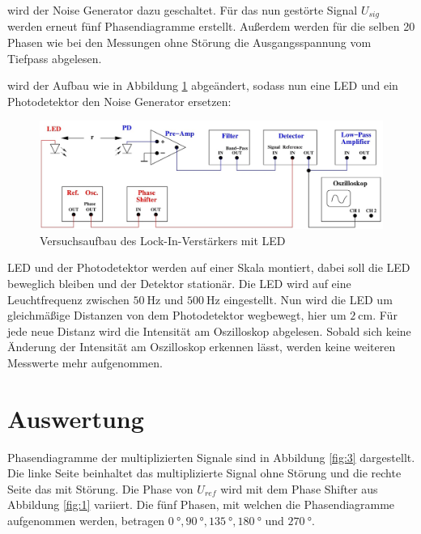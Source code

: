\justifying wird der Noise Generator dazu geschaltet. Für das nun gestörte Signal $U_{sig}$ werden erneut fünf Phasendiagramme
erstellt. Außerdem werden für die selben 20 Phasen wie bei den Messungen ohne Störung die Ausgangsspannung vom Tiefpass abgelesen. 

\justifying wird der Aufbau wie in Abbildung \ref{fig:2} abgeändert, sodass nun eine LED und ein Photodetektor den 
Noise Generator ersetzen:

\begin{figure}[H]
    \centering
    \includegraphics[width=\linewidth]{./images/lock-in_led.jpg}
    \caption{Versuchsaufbau des Lock-In-Verstärkers mit LED \cite{V303}}
    \label{fig:2}
\end{figure}

\justifying LED  und der Photodetektor werden auf einer Skala montiert, dabei soll die LED beweglich bleiben und der Detektor stationär.
Die LED wird auf eine Leuchtfrequenz zwischen $\SI{50}{\hertz}$ und $\SI{500}{\hertz}$ eingestellt. Nun wird die LED um gleichmäßige Distanzen
von dem Photodetektor wegbewegt, hier um $\SI{2}{\centi\meter}$. Für jede neue Distanz wird die Intensität am Oszilloskop abgelesen. Sobald sich keine
Änderung der Intensität am Oszilloskop erkennen lässt, werden keine weiteren Messwerte mehr aufgenommen.  


\section{Auswertung} \label{sec:5}

\justifying Phasendiagramme der multiplizierten Signale sind in Abbildung \ref{fig:3} dargestellt. Die linke Seite beinhaltet
das multiplizierte Signal ohne Störung und die rechte Seite das mit Störung. Die Phase von $U_{ref}$ wird mit dem Phase Shifter aus Abbildung 
\ref{fig:1} variiert. Die fünf Phasen, mit welchen die Phasendiagramme aufgenommen werden, betragen $\SI{0}{\degree}, \SI{90}{\degree}, 
\SI{135}{\degree}, \SI{180}{\degree}$ und $\SI{270}{\degree}$.

